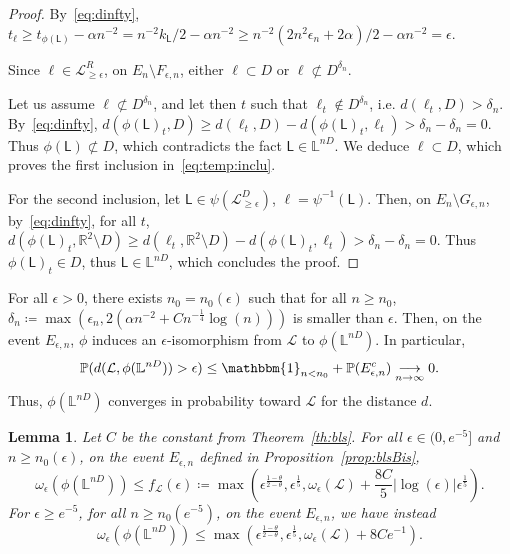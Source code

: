 \documentclass[11pt]{article}
\newtheorem{lemma}[theorem]{Lemma}
\begin{document}
\begin{proof}
    By~\eqref{eq:dinfty}, $ t_{\ell} \geq t_{\phi(\mathsf{L})} - \alpha n^{-2}=n^{-2}k_{\mathsf{L}}/2-\alpha n^{-2} \geq
    n^{-2}(     2 n^2 \epsilon_n+2\alpha   )/2-\alpha n^{-2}
    =\epsilon$.

    Since $\ell\in \mathcal{L}^R_{\geq \epsilon}$, on $E_n\setminus F_{\epsilon,n} $, either $\ell\subset D$ or $\ell\not\subset D^{\delta_n}$.

    Let us assume $\ell\not\subset D^{\delta_n}$, and let then $t$ such that $\ell_t\notin D^{\delta_n}$, i.e. $d(\ell_t, D)>\delta_n$.
    By~\eqref{eq:dinfty}, $d( \phi(\mathsf{L})_t   ,D)\geq d(\ell_t, D)- d(\phi(\mathsf{L})_t   ,\ell_t)>\delta_n-\delta_n=0$. Thus $\phi(\mathsf{L}) \not\subset D$, which contradicts the fact $\mathsf{L}\in \mathbb{L}^{nD}$. We deduce $\ell \subset D$, which proves the first inclusion in~\eqref{eq:temp:inclu}.

    For the second inclusion, let $\mathsf{L}\in \psi( \mathcal{L}_{\geq \epsilon}^{D})$, $\ell=\psi^{-1}(\mathsf{L})$. Then, on $E_n\setminus G_{\epsilon,n} $, by~\eqref{eq:dinfty}, for all $t$, $d(\phi(\mathsf{L})_t, \mathbb{R}^2 \setminus D)\geq  d(\ell_t, \mathbb{R}^2 \setminus D) -d( \phi(\mathsf{L})_t, \ell_t)>\delta_n -\delta_n=0$. Thus $\phi(\mathsf{L})_t \in D$, thus $\mathsf{L}\in\mathbb{L}^{nD}$, which concludes the proof.
\end{proof}
For all $\epsilon>0$, there exists $n_0= n_0(\epsilon)$ such that for all $n\geq n_0$, $\delta_n\coloneqq \max(\epsilon_n, 2(\alpha n^{-2}+Cn^{-\frac{1}{4}}\log(n)))$ is smaller than $\epsilon$. Then, on the event $E_{\epsilon,n}$, $\phi$ induces an $\epsilon$-isomorphism from $\mathcal{L}$ to $\phi(\mathbb{L}^{nD})$.
In particular,
\[
\mathbb{P}( d(  \mathcal{L},\phi(\mathbb{L}^{nD} ) )>\epsilon)\leq \mathbbm{1}_{n<n_0}+\mathbb{P}( E^c_{\epsilon,n} )\underset{n\to \infty}\longrightarrow 0.
\]
Thus, $\phi(\mathbb{L}^{nD}) $ converges in probability toward $\mathcal{L}$ for the distance $d$.
\begin{lemma}
\label{le:omegaequibound}
  Let $C$ be the constant from Theorem~\ref{th:bls}. For all $\epsilon\in(0,e^{-5}]$ and $n\geq n_0(\epsilon)$, on the event $E_{\epsilon,n}$ defined in Proposition~\ref{prop:blsBis},
  \begin{equation}
  \label{eq:omegabound}
  \omega_{\epsilon}( \phi(\mathbb{L}^{nD}) )\leq  f_{\mathcal{L}}(\epsilon)\coloneqq \max(\epsilon^\frac{1-\theta}{2-\theta},\epsilon^\frac{1}{5}, \omega_{\epsilon}(\mathcal{L})+\frac{8C}{5} |\log(\epsilon)| \epsilon^{\frac{1}{5}}).
  \end{equation}
  For $\epsilon\geq e^{-5}$, for all $ n\geq n_0(e^{-5})$, on the event $E_{\epsilon,n}$, we have instead \[ \omega_{\epsilon}( \phi(\mathbb{L}^{nD}) )\leq
\max(\epsilon^\frac{1-\theta}{2-\theta},\epsilon^\frac{1}{5}, \omega_{\epsilon}(\mathcal{L})+  8C e^{-1})
    .\]
\end{lemma}
\end{document}
